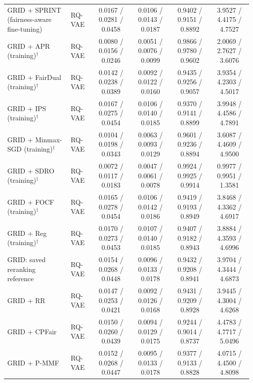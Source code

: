 \begin{table}[p]
{\begin{tabular}{llcccc}
GRID + SPRINT (fairness-aware fine-tuning) & RQ-VAE & 0.0167 / 0.0281 / 0.0458 & 0.0106 / 0.0143 / 0.0187 & 0.9402 / 0.9151 / 0.8892 & 3.9527 / 4.4175 / 4.7527 \\
GRID + APR (training)$^{\dagger}$ & RQ-VAE & 0.0080 / 0.0156 / 0.0246 & 0.0051 / 0.0076 / 0.0099 & 0.9866 / 0.9780 / 0.9602 & 2.0069 / 2.7627 / 3.6076 \\
GRID + FairDual (training)$^{\dagger}$ & RQ-VAE & 0.0142 / 0.0238 / 0.0389 & 0.0092 / 0.0122 / 0.0160 & 0.9435 / 0.9256 / 0.9057 & 3.9354 / 4.2303 / 4.5017 \\
GRID + IPS (training)$^{\dagger}$ & RQ-VAE & 0.0167 / 0.0275 / 0.0454 & 0.0106 / 0.0140 / 0.0185 & 0.9370 / 0.9141 / 0.8899 & 3.9948 / 4.4586 / 4.7891 \\
GRID + Minmax-SGD (training)$^{\dagger}$ & RQ-VAE & 0.0104 / 0.0198 / 0.0343 & 0.0063 / 0.0093 / 0.0129 & 0.9601 / 0.9236 / 0.8894 & 3.6087 / 4.4609 / 4.9500 \\
GRID + SDRO (training)$^{\dagger}$ & RQ-VAE & 0.0072 / 0.0117 / 0.0183 & 0.0047 / 0.0061 / 0.0078 & 0.9924 / 0.9925 / 0.9914 & 0.9977 / 0.9951 / 1.3581 \\
GRID + FOCF (training)$^{\dagger}$ & RQ-VAE & 0.0165 / 0.0278 / 0.0454 & 0.0106 / 0.0142 / 0.0186 & 0.9419 / 0.9193 / 0.8949 & 3.8468 / 4.3362 / 4.6917 \\
GRID + Reg (training)$^{\dagger}$ & RQ-VAE & 0.0170 / 0.0273 / 0.0453 & 0.0107 / 0.0140 / 0.0185 & 0.9407 / 0.9182 / 0.8943 & 3.8884 / 4.3593 / 4.6996 \\
GRID: saved reranking reference & RQ-VAE & 0.0154 / 0.0268 / 0.0448 & 0.0096 / 0.0133 / 0.0178 & 0.9432 / 0.9208 / 0.8941 & 3.9704 / 4.3444 / 4.6873 \\
GRID + RR & RQ-VAE & 0.0147 / 0.0253 / 0.0421 & 0.0092 / 0.0126 / 0.0168 & 0.9431 / 0.9209 / 0.8928 & 3.9445 / 4.3004 / 4.6268 \\
GRID + CPFair & RQ-VAE & 0.0150 / 0.0260 / 0.0439 & 0.0094 / 0.0129 / 0.0175 & 0.9244 / 0.9014 / 0.8737 & 4.4783 / 4.7717 / 5.0496 \\
GRID + P-MMF & RQ-VAE & 0.0152 / 0.0268 / 0.0447 & 0.0095 / 0.0133 / 0.0178 & 0.9377 / 0.9133 / 0.8828 & 4.0715 / 4.4500 / 4.8098 \\
\bottomrule
\end{tabular}%
}
\end{table}

